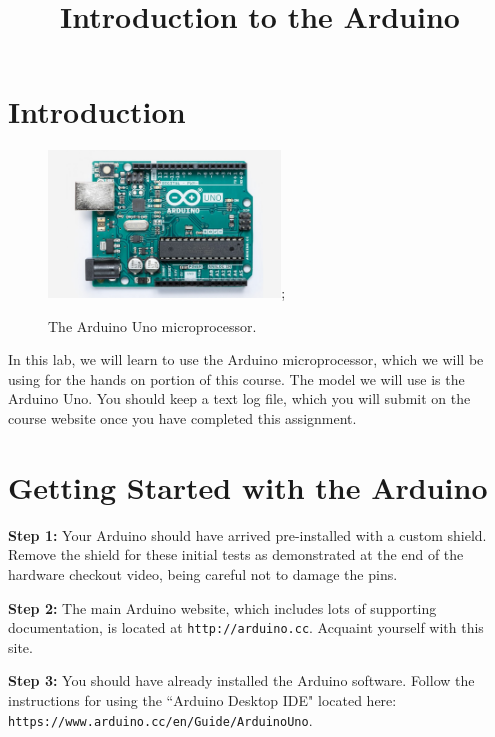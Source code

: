 \documentclass[12pt]{article}
\begin{document}

\title{Introduction to the Arduino} 

\maketitle

\section{Introduction}

\begin{figure}[htbp]
\begin{center}
 \includegraphics[width=0.55\textwidth]{figs/uno.jpg};
\caption{\label{fig:uno} The Arduino Uno microprocessor.}
\end{center}
\end{figure}

In this lab, we will learn to use the Arduino microprocessor, which we
will be using for the hands on portion of this course.  The model we
will use is the Arduino Uno.  You should keep a text log file, which
you will submit on the course website once you have completed this
assignment.

\section{Getting Started with the Arduino}

\noindent
{\bf Step 1:} Your Arduino should have arrived pre-installed with a
custom shield.  Remove the shield for these initial tests as
demonstrated at the end of the hardware checkout video, being careful
not to damage the pins.

\vspace{0.5 cm}    
\noindent
{\bf Step 2:} The main Arduino website, which includes lots of
supporting documentation, is located at {\tt http://arduino.cc}.
Acquaint yourself with this site.

\vspace{0.5 cm}
\noindent
{\bf Step 3:} You should have already installed the Arduino software.
Follow the instructions for using the ``Arduino Desktop IDE" located here:  
{\tt https://www.arduino.cc/en/Guide/ArduinoUno}.
\end{document}
